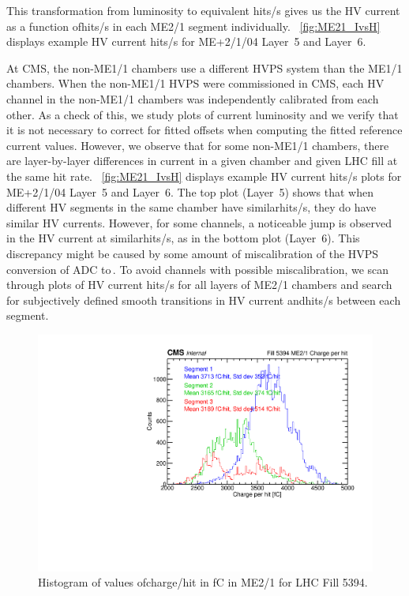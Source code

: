 This transformation from luminosity to equivalent \unit{hits/s} gives us the HV current as a function of\unit{hits/s} in each ME2/1 segment individually. \Fig~\ref{fig:ME21_IvsH} displays example HV current \vs \unit{hits/s} for ME+2/1/04 Layer~5 and Layer~6. 

At CMS, the non-ME1/1 chambers use a different HVPS system than the ME1/1 chambers. When the non-ME1/1 HVPS were commissioned in CMS, each HV channel in the non-ME1/1 chambers was independently calibrated from each other. As a check of this, we study plots of current \vs luminosity and we verify that it is not necessary to correct for fitted offsets when computing the fitted reference current values. However, we observe that for some non-ME1/1 chambers, there are layer-by-layer differences in current in a given chamber and given LHC fill at the same hit rate. \Fig~\ref{fig:ME21_IvsH} displays example HV current \vs \unit{hits/s} plots for ME+2/1/04 Layer~5 and Layer~6. The top plot (Layer~5) shows that when different HV segments in the same chamber have similar\unit{hits/s}, they do have similar HV currents. However, for some channels, a noticeable jump is observed in the HV current at similar\unit{hits/s}, as in the bottom plot (Layer~6). This discrepancy might be caused by some amount of miscalibration of the HVPS conversion of ADC to$\,$\muA. To avoid channels with possible miscalibration, we scan through plots of HV current \vs\unit{hits/s} for all layers of ME2/1 chambers and search for subjectively defined smooth transitions in HV current and\unit{hits/s} between each segment. 

\begin{figure}
	\centering
	\includegraphics[width=\dummyFigWidth]{figures/neutron/ME21_f5394_chph_sel_hist.pdf}
	\caption{Histogram of values of\unit{charge/hit} in fC in ME2/1 for LHC Fill 5394.}
	\label{fig:ME21_fill_5394_chph_histo}
\end{figure}

